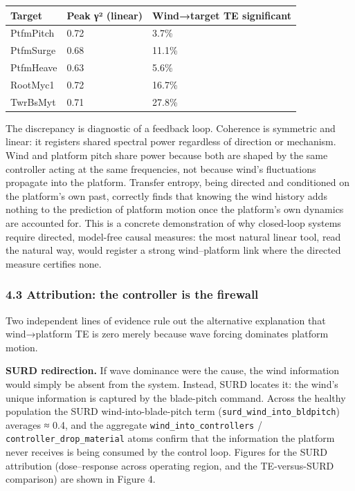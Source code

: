 \documentclass[
  english,
  11pt,
]{article}
\begin{document}
\begin{longtable}[]{@{}lll@{}}
\toprule\noalign{}
Target & Peak γ² (linear) & Wind→target TE significant \\
\midrule\noalign{}
\endhead
\bottomrule\noalign{}
\endlastfoot
PtfmPitch & 0.72 & 3.7\% \\
PtfmSurge & 0.68 & 11.1\% \\
PtfmHeave & 0.63 & 5.6\% \\
RootMyc1 & 0.72 & 16.7\% \\
TwrBsMyt & 0.71 & 27.8\% \\
\end{longtable}

The discrepancy is diagnostic of a feedback loop. Coherence is symmetric
and linear: it registers shared spectral power regardless of direction
or mechanism. Wind and platform pitch share power because both are
shaped by the same controller acting at the same frequencies, not
because wind's fluctuations propagate into the platform. Transfer
entropy, being directed and conditioned on the platform's own past,
correctly finds that knowing the wind history adds nothing to the
prediction of platform motion once the platform's own dynamics are
accounted for. This is a concrete demonstration of why closed-loop
systems require directed, model-free causal measures: the most natural
linear tool, read the natural way, would register a strong
wind--platform link where the directed measure certifies none.

\subsubsection{4.3 Attribution: the controller is the
firewall}\label{attribution-the-controller-is-the-firewall}

Two independent lines of evidence rule out the alternative explanation
that wind→platform TE is zero merely because wave forcing dominates
platform motion.

\textbf{SURD redirection.} If wave dominance were the cause, the wind
information would simply be absent from the system. Instead, SURD
locates it: the wind's unique information is captured by the blade-pitch
command. Across the healthy population the SURD wind-into-blade-pitch
term (\texttt{surd\_wind\_into\_bldpitch}) averages ≈ 0.4, and the
aggregate \texttt{wind\_into\_controllers} /
\texttt{controller\_drop\_material} atoms confirm that the information
the platform never receives is being consumed by the control loop.
Figures for the SURD attribution (dose--response across operating
region, and the TE-versus-SURD comparison) are shown in Figure 4.
\end{document}

